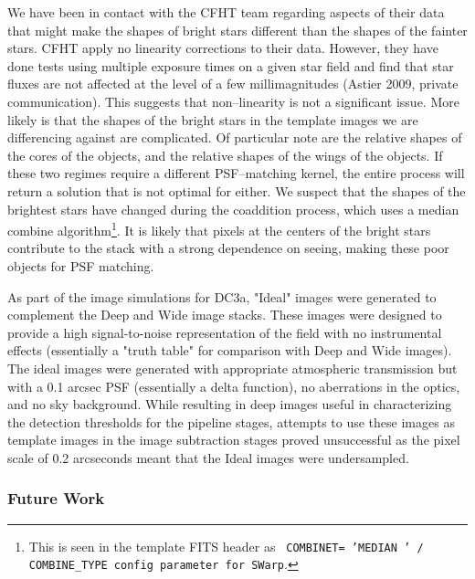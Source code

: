We have been in contact with the CFHT team regarding aspects of their
data that might make the shapes of bright stars different than the
shapes of the fainter stars.  CFHT apply no linearity corrections to
their data.  However, they have done tests using multiple exposure
times on a given star field and find that star fluxes are not affected
at the level of a few millimagnitudes (Astier 2009, private
communication).  This suggests that non--linearity is not a
significant issue.  More likely is that the shapes of the bright stars
in the template images we are differencing against are complicated.
Of particular note are the relative shapes of the cores of the
objects, and the relative shapes of the wings of the objects.  If
these two regimes require a different PSF--matching kernel, the entire
process will return a solution that is not optimal for either.  We
suspect that the shapes of the brightest stars have changed during the
coaddition process, which uses a median combine
algorithm\footnote{This is seen in the template FITS header as {\tt
COMBINET= 'MEDIAN ' / COMBINE\_TYPE config parameter for SWarp}.}.  It
is likely that pixels at the centers of the bright stars contribute to
the stack with a strong dependence on seeing, making these poor
objects for PSF matching.

As part of the image simulations for DC3a, "Ideal" images were
generated to complement the Deep and Wide image stacks. These images
were designed to provide a high signal-to-noise representation of the
field with no instrumental effects (essentially a "truth table" for
comparison with Deep and Wide images). The ideal images were generated
with appropriate atmospheric transmission but with a 0.1 arcsec PSF
(essentially a delta function), no aberrations in the optics, and no
sky background. While resulting in deep images useful in
characterizing the detection thresholds for the pipeline stages,
attempts to use these images as template images in the image
subtraction stages proved unsuccessful as the pixel scale of 0.2
arcseconds meant that the Ideal images were undersampled.



\subsubsection{Future Work}

